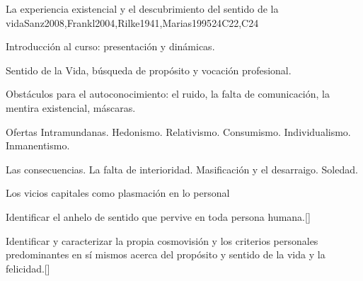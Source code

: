 \begin{syllabus}
\begin{outcomes}
    \item {}
    \item {}
\end{outcomes}
\begin{competences}
    \item {}
    \item {}
\end{competences}

\begin{unit}{}{La experiencia existencial y el descubrimiento del sentido de la vida}{Sanz2008,Frankl2004,Rilke1941,Marias1995}{24}{C22,C24}
\begin{topics}
	\item Introducción al curso: presentación y dinámicas.
	\item Sentido de la Vida, búsqueda de propósito y vocación profesional.
	\item Obstáculos para el autoconocimiento: el ruido, la falta de comunicación, la mentira existencial, máscaras.
	\item Ofertas Intramundanas.
		\subitem Hedonismo.
		\subitem Relativismo.
		\subitem Consumismo.
		\subitem Individualismo.
		\subitem Inmanentismo.
	\item Las consecuencias.
		\subitem La falta de interioridad.
		\subitem Masificación y el desarraigo.
		\subitem Soledad. 
	\item Los vicios capitales como plasmación en lo personal
\end{topics}
\begin{learningoutcomes}
	\item Identificar el anhelo de sentido que pervive en toda persona humana.[\Familiarity]
	\item Identificar y caracterizar la propia cosmovisión y los criterios personales predominantes en sí­ mismos acerca del propósito y sentido de la vida y la felicidad.[\Familiarity]
\end{learningoutcomes}
\end{unit}


\end{syllabus}

